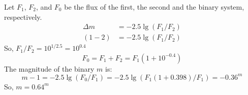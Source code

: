 Let $F_1$, $F_2$, and $F_0$ be the flux of the first, the second and the binary
system, respectively.
\begin{align*}
\Delta m &= -2.5 \lg (F_1/F_2)\\
(1-2) &= -2.5 \lg (F_1/F_2) \tag*{5}
\end{align*}
So, $F_1/F_2 = 10^{1/2.5} = 10^{0.4}$
\begin{equation*}
F_0 = F_1 + F_2 = F_1 (1 + 10^{-0.4}) \tag*{3}
\end{equation*}
The magnitude of the binary $m$ is:
\begin{equation*}
m - 1 = -2.5 \lg (F_0/F_1) = -2.5 \lg (F_1 (1+0.398)/F_1) = -0.36^m \tag*{2}
\end{equation*}
So, $m = 0.64^m$
